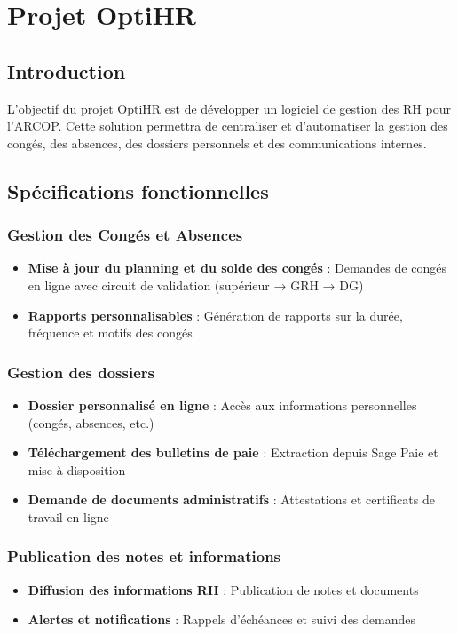
\section{Projet OptiHR}
\subsection{Introduction}
L'objectif du projet OptiHR est de développer un logiciel de gestion des \ac{RH} pour l'ARCOP. Cette solution permettra de centraliser et d'automatiser la gestion des congés, des absences, des dossiers personnels et des communications internes.

\subsection{Spécifications fonctionnelles}
\subsubsection{Gestion des Congés et Absences}
\begin{itemize}
    \item \textbf{Mise à jour du planning et du solde des congés} : Demandes de congés en ligne avec circuit de validation (supérieur → GRH → DG)
    \item \textbf{Rapports personnalisables} : Génération de rapports sur la durée, fréquence et motifs des congés
\end{itemize}

\subsubsection{Gestion des dossiers}
\begin{itemize}
    \item \textbf{Dossier personnalisé en ligne} : Accès aux informations personnelles (congés, absences, etc.)
    \item \textbf{Téléchargement des bulletins de paie} : Extraction depuis Sage Paie et mise à disposition
    \item \textbf{Demande de documents administratifs} : Attestations et certificats de travail en ligne
\end{itemize}

\subsubsection{Publication des notes et informations}
\begin{itemize}
    \item \textbf{Diffusion des informations RH} : Publication de notes et documents
    \item \textbf{Alertes et notifications} : Rappels d'échéances et suivi des demandes
\end{itemize}

